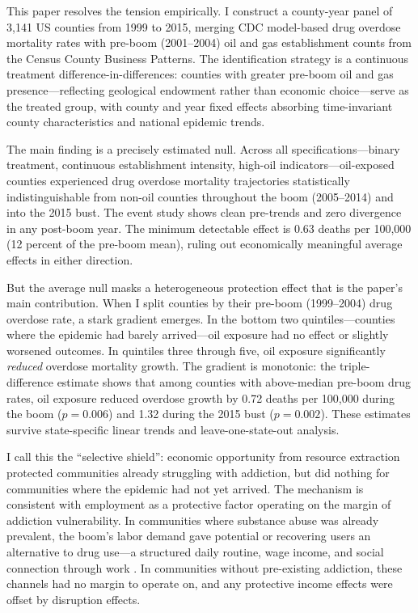 \documentclass[12pt]{article}
\begin{document}
This paper resolves the tension empirically. I construct a county-year panel of 3,141 US counties from 1999 to 2015, merging CDC model-based drug overdose mortality rates with pre-boom (2001--2004) oil and gas establishment counts from the Census County Business Patterns. The identification strategy is a continuous treatment difference-in-differences: counties with greater pre-boom oil and gas presence---reflecting geological endowment rather than economic choice---serve as the treated group, with county and year fixed effects absorbing time-invariant county characteristics and national epidemic trends.

The main finding is a precisely estimated null. Across all specifications---binary treatment, continuous establishment intensity, high-oil indicators---oil-exposed counties experienced drug overdose mortality trajectories statistically indistinguishable from non-oil counties throughout the boom (2005--2014) and into the 2015 bust. The event study shows clean pre-trends and zero divergence in any post-boom year. The minimum detectable effect is 0.63 deaths per 100,000 (12 percent of the pre-boom mean), ruling out economically meaningful average effects in either direction.

But the average null masks a heterogeneous protection effect that is the paper's main contribution. When I split counties by their pre-boom (1999--2004) drug overdose rate, a stark gradient emerges. In the bottom two quintiles---counties where the epidemic had barely arrived---oil exposure had no effect or slightly worsened outcomes. In quintiles three through five, oil exposure significantly \textit{reduced} overdose mortality growth. The gradient is monotonic: the triple-difference estimate shows that among counties with above-median pre-boom drug rates, oil exposure reduced overdose growth by 0.72 deaths per 100,000 during the boom ($p = 0.006$) and 1.32 during the 2015 bust ($p = 0.002$). These estimates survive state-specific linear trends and leave-one-state-out analysis.

I call this the ``selective shield'': economic opportunity from resource extraction protected communities already struggling with addiction, but did nothing for communities where the epidemic had not yet arrived. The mechanism is consistent with employment as a protective factor operating on the margin of addiction vulnerability. In communities where substance abuse was already prevalent, the boom's labor demand gave potential or recovering users an alternative to drug use---a structured daily routine, wage income, and social connection through work \citep{krueger2017, venkataramani2020}. In communities without pre-existing addiction, these channels had no margin to operate on, and any protective income effects were offset by disruption effects.
\end{document}
